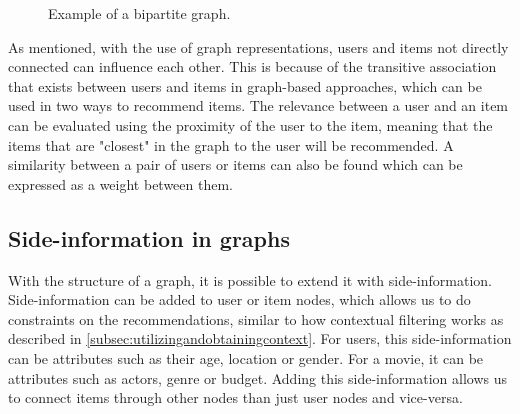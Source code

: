 \begin{figure}[h]
\caption{Example of a bipartite graph.}
\label{fig:bipartite-graph}
\end{figure}
As mentioned, with the use of graph representations, users and items not directly connected can influence each other.
This is because of the transitive association that exists between users and items in graph-based approaches, which can be used in two ways to recommend items.
The relevance between a user and an item can be evaluated using the proximity of the user to the item, meaning that the items that are "closest" in the graph to the user will be recommended.
A similarity between a pair of users or items can also be found which can be expressed as a weight between them\cite{RecommenderHandbook2015}.

\subsection{Side-information in graphs}
With the structure of a graph, it is possible to extend it with side-information.
Side-information can be added to user or item nodes, which allows us to do constraints on the recommendations, similar to how contextual filtering works as described in \autoref{subsec:utilizingandobtainingcontext}.
For users, this side-information can be attributes such as their age, location or gender.
For a movie, it can be attributes such as actors, genre or budget.
Adding this side-information allows us to connect items through other nodes than just user nodes and vice-versa.
